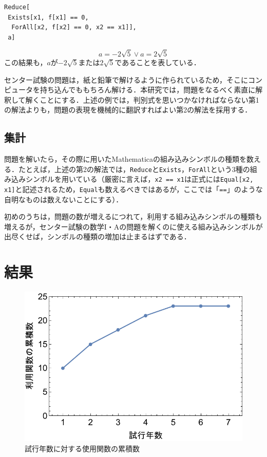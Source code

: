 \documentclass[uplatex,twocolumn]{jsarticle}
\begin{document}
\begin{verbatim}
Reduce[
 Exists[x1, f[x1] == 0,
  ForAll[x2, f[x2] == 0, x2 == x1]],
 a]
\end{verbatim}
\vspace{-5mm}\[a=-2 \sqrt{5}\lor a=2 \sqrt{5}\]
この結果も，$a$が$-2\sqrt{5}$または$2\sqrt{5}$であることを表している．

センター試験の問題は，紙と鉛筆で解けるように作られているため，そこにコンピュータを持ち込んでももちろん解ける．本研究では，問題をなるべく素直に解釈して解くことにする．上述の例では，判別式を思いつかなければならない第1の解法よりも，問題の表現を機械的に翻訳すればよい第2の解法を採用する．

\subsection{集計}

問題を解いたら，その際に用いたMathematicaの組み込みシンボルの種類を数える．たとえば，上述の第2の解法では，\verb|Reduce|と\verb|Exists|，\verb|ForAll|という3種の組み込みシンボルを用いている（厳密に言えば，\verb|x2 == x1|は正式には\verb|Equal[x2, x1]|と記述されるため，\verb|Equal|も数えるべきではあるが，ここでは「\verb|==|」のような自明なものは数えないことにする）．

初めのうちは，問題の数が増えるにつれて，利用する組み込みシンボルの種類も増えるが，センター試験の数学I・Aの問題を解くのに使える組み込みシンボルが出尽くせば，シンボルの種類の増加は止まるはずである．

\section{結果}

\begin{figure}[tb]
\centering
\includegraphics[scale=0.5]{code.pdf}
\caption{試行年数に対する使用関数の累積数}\label{累積グラフ}
\end{figure}
\end{document}
